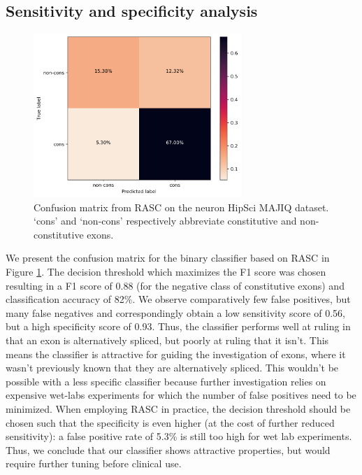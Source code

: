 \subsection{Sensitivity and specificity analysis}
\begin{figure}
	\centering\includegraphics[width=0.7\textwidth]{../visualizations/ch5-results/confusion_matrix.png} 
	\caption{Confusion matrix from RASC on the neuron HipSci MAJIQ dataset. `cons' and `non-cons' respectively abbreviate constitutive and non-constitutive exons. }
	\label{fig:confusion_matrix}
\end{figure}

We present the confusion matrix for the binary classifier based on RASC in Figure \ref{fig:confusion_matrix}. The decision threshold which maximizes the F1 score was chosen resulting in a F1 score of 0.88 (for the negative class of constitutive exons) and classification accuracy of 82\%. We observe comparatively few false positives, but many false negatives and correspondingly obtain a low sensitivity score of 0.56, but a high specificity score of 0.93. Thus, the classifier performs well at ruling in that an exon is alternatively spliced, but poorly at ruling that it isn't. This means the classifier is attractive for guiding the investigation of exons, where it wasn't previously known that they are alternatively spliced. This wouldn't be possible with a less specific classifier because further investigation relies on expensive wet-labs experiments for which the number of false positives need to be minimized. When employing RASC in practice, the decision threshold should be chosen such that the specificity is even higher (at the cost of further reduced sensitivity): a false positive rate of 5.3\% is still too high for wet lab experiments. Thus, we conclude that our classifier shows attractive properties, but would require further tuning before clinical use. 

